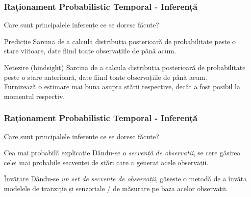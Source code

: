 \begin{frame}
  \frametitle{Raționament Probabilistic Temporal - Inferență}
	Care sunt principalele inferențe ce se doresc făcute?	
	\begin{block}{Predicție}
		\justifying		
		Sarcina de a calcula distribuția posterioară de probabilitate peste o \alert{stare viitoare}, 
		date fiind toate observațiile de până acum.
	\end{block}
	\pause
	
	\begin{block}{Netezire (hindsight)}
		\justifying		
		Sarcina de a calcula distribuția posterioară de probabilitate peste o \alert{stare anterioară}, 
		date fiind toate observațiile de până acum.\\
		Furnizează o estimare mai buna asupra stării respective, decât a fost posibil la momentul respectiv.
	\end{block}
\end{frame}

\begin{frame}
  \frametitle{Raționament Probabilistic Temporal - Inferență}
	Care sunt principalele inferențe ce se doresc făcute?	
	\begin{block}{Cea mai probabilă explicație}
		\justifying		
		Dându-se o \emph{secvență de observații}, se cere găsirea \alert{celei mai probabile secvenței de stări}
		care a generat acele observații.
	\end{block}
	\pause
	
	\begin{block}{Învățare}
		\justifying		
		Dându-se \emph{un set de secvențe de observații}, găsește o metodă de a învăța \alert{modelele} de
		\alert{tranziție} și \alert{senzoriale / de măsurare} pe baza acelor observații.
	\end{block}
\end{frame}

